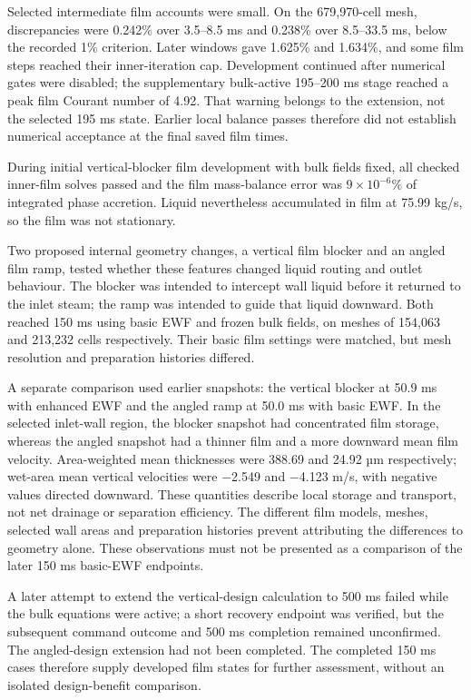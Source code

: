 Selected intermediate film accounts were small. On the 679,970-cell mesh, discrepancies were 0.242\% over 3.5--8.5 ms and 0.238\% over 8.5--33.5 ms, below the recorded 1\% criterion. Later windows gave 1.625\% and 1.634\%, and some film steps reached their inner-iteration cap. Development continued after numerical gates were disabled; the supplementary bulk-active 195--200 ms stage reached a peak film Courant number of 4.92. That warning belongs to the extension, not the selected 195 ms state. Earlier local balance passes therefore did not establish numerical acceptance at the final saved film times.

During initial vertical-blocker film development with bulk fields fixed, all checked inner-film solves passed and the film mass-balance error was \(9 \times 10^{-6}\)\% of integrated phase accretion. Liquid nevertheless accumulated in film at 75.99 kg/s, so the film was not stationary.

Two proposed internal geometry changes, a vertical film blocker and an angled film ramp, tested whether these features changed liquid routing and outlet behaviour. The blocker was intended to intercept wall liquid before it returned to the inlet steam; the ramp was intended to guide that liquid downward. Both reached 150 ms using basic EWF and frozen bulk fields, on meshes of 154,063 and 213,232 cells respectively. Their basic film settings were matched, but mesh resolution and preparation histories differed.

A separate comparison used earlier snapshots: the vertical blocker at 50.9 ms with enhanced EWF and the angled ramp at 50.0 ms with basic EWF. In the selected inlet-wall region, the blocker snapshot had concentrated film storage, whereas the angled snapshot had a thinner film and a more downward mean film velocity. Area-weighted mean thicknesses were 388.69 and 24.92 µm respectively; wet-area mean vertical velocities were −2.549 and −4.123 m/s, with negative values directed downward. These quantities describe local storage and transport, not net drainage or separation efficiency. The different film models, meshes, selected wall areas and preparation histories prevent attributing the differences to geometry alone. These observations must not be presented as a comparison of the later 150 ms basic-EWF endpoints.

A later attempt to extend the vertical-design calculation to 500 ms failed while the bulk equations were active; a short recovery endpoint was verified, but the subsequent command outcome and 500 ms completion remained unconfirmed. The angled-design extension had not been completed. The completed 150 ms cases therefore supply developed film states for further assessment, without an isolated design-benefit comparison.

